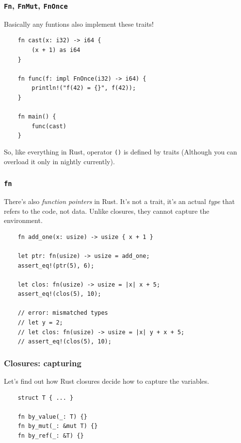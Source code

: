 \documentclass[aspectratio=1610,t]{beamer}
\begin{document}

\begin{frame}[fragile]
\frametitle{\texttt{Fn}, \texttt{FnMut}, \texttt{FnOnce}}
Basically any funtions also implement these traits!

\begin{verbatim}
    fn cast(x: i32) -> i64 {
        (x + 1) as i64
    }

    fn func(f: impl FnOnce(i32) -> i64) {
        println!("f(42) = {}", f(42));
    }

    fn main() {
        func(cast)
    }
\end{verbatim}

So, like everything in Rust, operator \texttt{()} is defined by traits (Although you can overload it only in nightly currently).
\end{frame}


\begin{frame}[fragile]
\frametitle{\texttt{fn}}
There's also \textit{function pointers} in Rust. It's not a trait, it's an actual \textit{type} that refers to the code, not data. Unlike closures, they cannot capture the environment.

\begin{verbatim}
    fn add_one(x: usize) -> usize { x + 1 }

    let ptr: fn(usize) -> usize = add_one;
    assert_eq!(ptr(5), 6);

    let clos: fn(usize) -> usize = |x| x + 5;
    assert_eq!(clos(5), 10);

    // error: mismatched types
    // let y = 2;
    // let clos: fn(usize) -> usize = |x| y + x + 5;
    // assert_eq!(clos(5), 10);
\end{verbatim}
\end{frame}


\begin{frame}[fragile]
\frametitle{Closures: capturing}
Let's find out how Rust closures decide how to capture the variables.

\begin{verbatim}
    struct T { ... }

    fn by_value(_: T) {}
    fn by_mut(_: &mut T) {}
    fn by_ref(_: &T) {}
\end{verbatim}
\end{frame}
\end{document}
